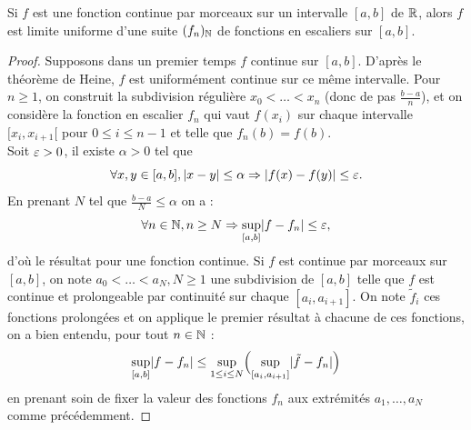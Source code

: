 \documentclass{article}
\begin{document}
\begin{thm}
Si $f$ est une fonction continue par morceaux sur un intervalle $[a,b]$ de $\mathbb{R}$, alors $f$ est limite uniforme d'une suite $(f_n)_{\mathbb{N}}$ 
de fonctions en escaliers sur $[a,b]$.
\end{thm}

\begin{proof}
Supposons dans un premier temps $f$ continue sur $[a,b]$. D'après le théorème de Heine, $f$ est uniformément continue sur ce même
intervalle. 
Pour $n \geq 1$, on construit la subdivision régulière $x_0 < \dots < x_n$ (donc de pas $\frac{b-a}{n}$), 
et on considère la fonction en escalier $f_n$ qui vaut $f(x_i)$ sur chaque intervalle $[x_i, x_{i+1}[$ pour $0 \leq i \leq n-1$ 
et telle que $f_n(b)=f(b)$. \\

Soit $\varepsilon > 0$, il existe $\alpha >0$ tel que 
\[ \forall x, y \in [a,b], \lvert x-y\rvert \leq \alpha \Rightarrow \lvert f(x)-f(y)\rvert \leq \varepsilon . \]
En prenant $N$ tel que $\frac{b-a}{N} \leq \alpha$ on a :
\[ \forall n \in \mathbb{N}, n \geq N \Rightarrow \sup_{[a,b]} \lvert f-f_n\rvert \leq \varepsilon , \]
d'où le résultat pour une fonction continue. Si $f$ est continue par morceaux sur $[a,b]$, on note $a_0 < \dots < a_N, N \geq 1$ 
une subdivision de $[a,b]$ telle que $f$ est continue et prolongeable par continuité sur chaque $[a_i, a_{i+1}]$.
On note $\tilde{f}_i$ ces fonctions prolongées et on applique le premier résultat à chacune de ces fonctions,
on a bien entendu, pour tout $n \in \mathbb{N}$ :
\[ \sup_{[a,b]} \lvert f-f_n\rvert \leq \sup_{1 \leq i \leq N} \Bigl(  \sup_{[a_i, a_{i+1}]} \lvert\tilde{f} - f_n\rvert  \Bigr) \]
en prenant soin de fixer la valeur des fonctions $f_n$ aux extrémités $a_1, \dots, a_N$ comme précédemment.
\end{proof}
\end{document}

